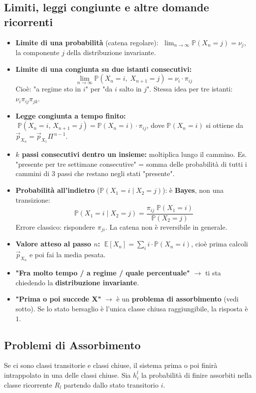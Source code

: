 \documentclass[12pt]{extarticle} %
\begin{document}
\subsection{Limiti, leggi congiunte e altre domande ricorrenti}
\begin{itemize}
    \item \textbf{Limite di una probabilità} (catena regolare): $\;\lim_{n \to \infty} \mathbb{P}(X_n = j) = \nu_j$, la componente $j$ della distribuzione invariante.
    \item \textbf{Limite di una congiunta su due istanti consecutivi:}
    $$ \lim_{n \to \infty} \mathbb{P}(X_n = i,\; X_{n+1} = j) = \nu_i \cdot \pi_{ij} $$
    {\footnotesize Cioè: "a regime sto in $i$" per "da $i$ salto in $j$". Stessa idea per tre istanti: $\nu_i \pi_{ij}\pi_{jk}$.}
    \item \textbf{Legge congiunta a tempo finito:} $\;\mathbb{P}(X_n = i,\, X_{n+1} = j) = \mathbb{P}(X_n = i) \cdot \pi_{ij}$, dove $\mathbb{P}(X_n=i)$ si ottiene da $\vec{p}_{X_n} = \vec{p}_{X_1}\Pi^{\,n-1}$.
    \item \textbf{$k$ passi consecutivi dentro un insieme:} moltiplica lungo il cammino. {\footnotesize Es. "presente per tre settimane consecutive" = somma delle probabilità di tutti i cammini di 3 passi che restano negli stati "presente".}
    \item \textbf{Probabilità all'indietro} ($\mathbb{P}(X_1 = i \mid X_2 = j)$): è \textbf{Bayes}, non una transizione:
    $$ \mathbb{P}(X_1 = i \mid X_2 = j) = \frac{\pi_{ij}\; \mathbb{P}(X_1 = i)}{\mathbb{P}(X_2 = j)} $$
    {\footnotesize Errore classico: rispondere $\pi_{ji}$. La catena non è reversibile in generale.}
    \item \textbf{Valore atteso al passo $n$:} $\;\mathbb{E}[X_n] = \sum_{i} i \cdot \mathbb{P}(X_n = i)$, cioè prima calcoli $\vec{p}_{X_n}$ e poi fai la media pesata.
    \item \textbf{"Fra molto tempo / a regime / quale percentuale"} $\to$ ti sta chiedendo la \textbf{distribuzione invariante}.
    \item \textbf{"Prima o poi succede X"} $\to$ è un \textbf{problema di assorbimento} (vedi sotto). Se lo stato bersaglio è l'unica classe chiusa raggiungibile, la risposta è $1$.
\end{itemize}

\subsection{Problemi di Assorbimento}
Se ci sono classi transitorie e classi chiuse, il sistema prima o poi finirà intrappolato in una delle classi chiuse.
Sia $h_i^l$ la probabilità di finire assorbiti nella classe ricorrente $R_l$ partendo dallo stato transitorio $i$.
\end{document}
